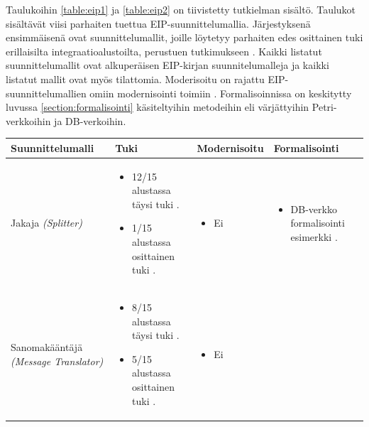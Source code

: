 Taulukoihin \ref{table:eip1} ja \ref{table:eip2} on tiivistetty tutkielman sisältö. Taulukot sisältävät viisi parhaiten tuettua EIP-suunnittelumallia. Järjestyksenä ensimmäisenä ovat suunnittelumallit, joille löytetyy parhaiten edes osittainen tuki erillaisilta integraatioalustoilta, perustuen tutkimukseen \citep{Ritter2017}.
Kaikki listatut suunnittelumallit ovat alkuperäisen EIP-kirjan \citep{Hohpe2004} suunnitelumalleja ja kaikki listatut mallit ovat myös tilattomia.
Moderisoitu on rajattu EIP-suunnittelumallien omiin modernisointi toimiin \citep{HohpeModernExamples}. Formalisoinnissa on keskitytty luvussa \ref{section:formalisointi} käsiteltyihin metodeihin eli värjättyihin Petri-verkkoihin ja DB-verkoihin.

\begin{table}[h]
\centering
    \begin{tabular}{|p{}|p{}|p{}|p{}|}
    \hline
    Suunnittelumalli & Tuki & Modernisoitu & Formalisointi \\ \hline
    Jakaja \textit{(Splitter)} &
        \begin{itemize}
            \item 12/15 alustassa täysi tuki \citep{Ritter2017}.
            \item 1/15 alustassa osittainen tuki \citep{Ritter2017}.
        \end{itemize}
      &
        \begin{itemize}
            \item Ei
        \end{itemize}
      &
        \begin{itemize}
           \item DB-verkko formalisointi esimerkki \citep{Ritter2021}.
        \end{itemize}
    \\ \hline
    Sanomakääntäjä \textit{(Message Translator)} & 
        \begin{itemize}
            \item 8/15 alustassa täysi tuki \citep{Ritter2017}.
            \item 5/15 alustassa osittainen tuki \citep{Ritter2017}.
        \end{itemize}
      &
        \begin{itemize}
            \item Ei
        \end{itemize}
      &  
        \begin{itemize}

\end{itemize}
\end{tabular}
\end{table}
